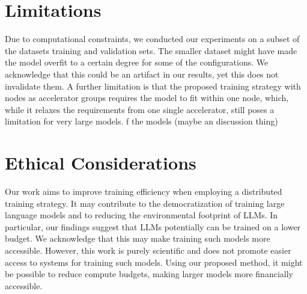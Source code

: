 \documentclass[runningheads]{llncs}
\begin{document}







\section{Limitations}
Due to computational constraints, we conducted our experiments on a subset of the datasets training and validation sets. The smaller dataset might have made the model overfit to a certain degree for some of the configurations. We acknowledge that this could be an artifact in our results, yet this does not invalidate them. A further limitation is that the proposed training strategy with nodes as accelerator groups requires the model to fit within one node, which, while it relaxes the requirements from one single accelerator, still poses a limitation for very large models.
f the models (maybe an discussion thing)

\section{Ethical Considerations}
Our work aims to improve training efficiency when employing a distributed training strategy. It may contribute to the democratization of training large language models and to reducing the environmental footprint of LLMs. In particular, our findings suggest that LLMs potentially can be trained on a lower budget. We acknowledge that this may make training such models more accessible. However, this work is purely scientific and does not promote easier access to systems for training such models. Using our proposed method, it might be possible to reduce compute budgets, making larger models more financially accessible. 



\end{document}
